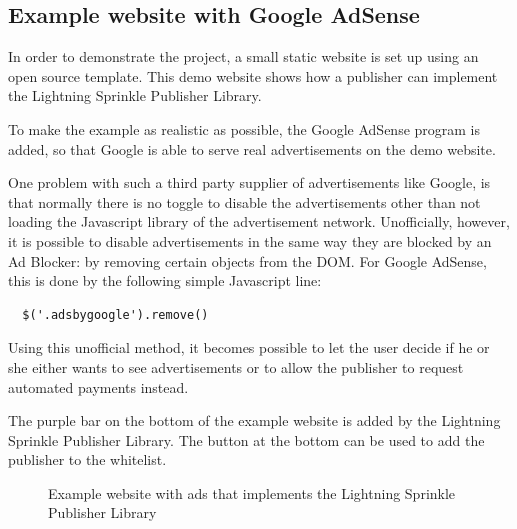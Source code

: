 \subsection{Example website with Google AdSense}
In order to demonstrate the project, a small static website is set up using an open source template. This demo website shows how a publisher can implement the Lightning Sprinkle Publisher Library. 

To make the example as realistic as possible, the Google AdSense program is added, so that Google is able to serve real advertisements on the demo website. 

One problem with such a third party supplier of advertisements like Google, is that normally there is no toggle to disable the advertisements other than not loading the Javascript library of the advertisement network. Unofficially, however, it is possible to disable advertisements in the same way they are blocked by an Ad Blocker: by removing certain objects from the DOM. For Google AdSense, this is done by the following simple Javascript line:


\lstset{language=Javascript}
\lstset{frame=lines}
\lstset{basicstyle=\footnotesize}
\begin{lstlisting}
  $('.adsbygoogle').remove()
\end{lstlisting}

Using this unofficial method, it becomes possible to let the user decide if he or she either wants to see advertisements or to allow the publisher to request automated payments instead.

The purple bar on the bottom of the example website is added by the Lightning Sprinkle Publisher Library. The button at the bottom can be used to add the publisher to the whitelist.

\begin{figure}[h!]
  \setlength{\fboxsep}{0pt}%
  \caption{Example website with ads that implements the Lightning Sprinkle Publisher Library}
\end{figure}
